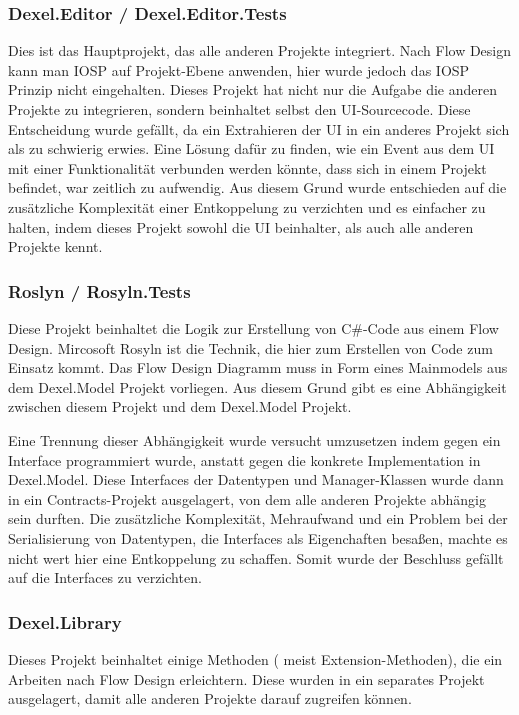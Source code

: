 \subsubsection{Dexel.Editor / Dexel.Editor.Tests}

Dies ist das Hauptprojekt, das alle anderen Projekte integriert.
Nach Flow Design kann man IOSP auf Projekt-Ebene anwenden, hier wurde jedoch das IOSP
Prinzip nicht eingehalten. Dieses Projekt hat nicht nur die Aufgabe die
anderen Projekte zu integrieren, sondern beinhaltet selbst den
UI-Sourcecode. Diese Entscheidung wurde gefällt, da ein Extrahieren der UI
in ein anderes Projekt sich als zu schwierig erwies. Eine Lösung dafür zu
finden, wie ein Event aus dem UI mit einer Funktionalität verbunden werden
könnte, dass sich in einem Projekt befindet, war zeitlich zu
aufwendig. Aus diesem Grund wurde entschieden auf die zusätzliche
Komplexität einer Entkoppelung zu verzichten und es einfacher zu halten, indem
dieses Projekt sowohl die UI beinhalter, als auch alle anderen Projekte
kennt.

\subsubsection{Roslyn / Rosyln.Tests}

Diese Projekt beinhaltet die Logik zur Erstellung von C\#-Code aus einem Flow
Design. Mircosoft Rosyln ist die Technik, die hier zum Erstellen von Code zum
Einsatz kommt.
Das Flow Design Diagramm muss in Form eines Mainmodels aus dem
Dexel.Model Projekt vorliegen. Aus diesem Grund gibt es eine Abhängigkeit
zwischen diesem Projekt und dem Dexel.Model Projekt. 

Eine Trennung dieser Abhängigkeit wurde versucht umzusetzen indem gegen ein Interface
programmiert wurde, anstatt gegen die konkrete Implementation in
Dexel.Model. Diese Interfaces der Datentypen und Manager-Klassen wurde dann
in ein Contracts-Projekt ausgelagert, von dem alle anderen Projekte abhängig
sein durften. Die zusätzliche Komplexität, Mehraufwand und ein Problem bei
der Serialisierung von Datentypen, die Interfaces als Eigenchaften besaßen,
machte es nicht wert hier eine Entkoppelung zu schaffen. Somit wurde der
Beschluss gefällt auf die Interfaces zu verzichten.

\subsubsection{Dexel.Library}

Dieses Projekt beinhaltet einige Methoden ( meist Extension-Methoden), die ein Arbeiten
nach Flow Design erleichtern. Diese wurden in ein separates Projekt
ausgelagert, damit alle anderen Projekte darauf zugreifen können.

